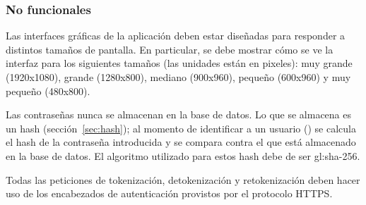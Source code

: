 %
%

\subsubsection{No funcionales}

{
  Las interfaces gráficas de la aplicación deben estar diseñadas para
  responder a distintos tamaños de pantalla. En particular, se debe
  mostrar cómo se ve la interfaz para los siguientes tamaños (las unidades están
  en pixeles): muy grande (1920x1080), grande (1280x800), mediano (900x960),
  pequeño (600x960) y muy pequeño (480x800).
}

{
  Las contraseñas nunca se almacenan en la base de datos. Lo que se almacena es
  un hash (sección~\ref{sec:hash}); al momento de identificar a un usuario
  () se calcula el hash de la
  contraseña introducida y se compara contra el que está almacenado en la base
  de datos. El algoritmo utilizado para estos hash debe de ser \gls{gl:sha}-256.
}

{
  Todas las peticiones de tokenización, detokenización y retokenización deben
  hacer uso de los encabezados de autenticación provistos por el protocolo
  HTTPS.
}
